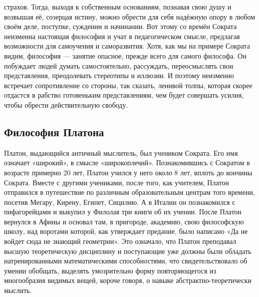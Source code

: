 страхов. Тогда, выходя к собственным основаниям, познавая свою душу и возвышая
её, созерцая истину, можно обрести для себя надёжную опору в любом своём деле,
поступке, суждении и начинании. Вот этому со времён Сократа неизменна настоящая
философия и учат в педагогическом смысле, предлагая возможности для самоучения и
саморазвития. Хотя, как мы на примере Сократа видим, философия — занятие
опасное, прежде всего для самого философа. Он побуждает людей думать
самостоятельно, рассуждать, переосмыслять свои представления, преодолевать
стереотипы и иллюзии. И поэтому неизменно встречает сопротивление со стороны,
так сказать, ленивой толпы, которая скорее отдастся в рабство готовеньким
представлениям, чем будет совершать усилия, чтобы обрести действительную
свободу. 

\subsection{Философия Платона}

Платон, выдающийся античный мыслитель, был учеником Сократа. Его имя
означает «широкий», в смысле «широкоплечий». Познакомившись с Сократом в
возрасте примерно 20 лет, Платон учился у него около 8 лет, вплоть до кончины
Сократа. Вместе с другими учениками, после того, как учителем, Платон отправился
в путешествие по различным образовательным центрам того времени, посетив Мегару,
Кирену, Египет, Сицилию. А в Италии он познакомился с пифагорейцами и выкупил у
Филолая три книги об их учении. После Платон вернулся в Афины и основал там, в
пригороде, академию, свою философскую школу, над воротами которой, как
утверждает предание, было написано «Да не войдет сюда не знающий геометрии». Это
означало, что Платон преподавал высшую теоретическую дисциплину и поступающие
уже должны были обладать натренированными математическими способностями, что
свидетельствовало об умении обобщать, выделять умозрительно форму повторяющегося
из многообразия видимых вещей, короче говоря, о навыке абстрактно-теоретически
мыслить. 

